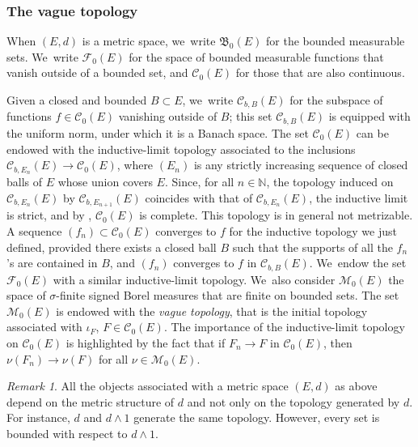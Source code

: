 \documentclass[10pt]{amsart}
\theoremstyle{definition}
\theoremstyle{remark}
\newtheorem{remark}[theorem]{Remark}
\begin{document}
\subsubsection{The vague topology}

When $(E,d)$ is a metric space, we~write $\mathfrak{B}_{0}(E)$ for the bounded measurable sets. We~write $\mathscr{F}_{0}(E)$ for the space of bounded measurable functions that vanish outside of a bounded set, and $\mathscr{C}_{0}(E)$ for those that are also continuous.

Given a closed and bounded $B \subset E$, we~write $\mathscr{C}_{b,B}(E)$ for the subspace of functions $f \in \mathscr{C}_{0}(E)$ vanishing outside of $B$; this set $\mathscr{C}_{b,B}(E)$ is equipped with the uniform norm, under which it is a Banach space.
The set $\mathscr{C}_{0}(E)$ can be endowed with the inductive-limit topology associated to the inclusions $\mathscr{C}_{b,E_{n}}(E) \to \mathscr{C}_{0}(E)$, where $(E_{n})$ is any strictly increasing sequence of closed balls of $E$ whose union covers $E$.
Since, for all $n \in \mathbb{N}$, the topology induced on $\mathscr{C}_{b,E_{n}}(E)$ by $\mathscr{C}_{b,E_{n+1}}(E)$ coincides with that of $\mathscr{C}_{b,E_{n}}(E)$, the inductive limit is strict, and by \cite[Prop.\,9(iii), p.\,II.35]{BourbakiEVT}, $\mathscr{C}_{0}(E)$ is complete.
This topology is in general not metrizable.
A sequence $(f_{n}) \subset \mathscr{C}_{0}(E)$ converges to $f$ for the inductive topology we just defined, provided there exists a closed ball $B$ such that the supports of all the $f_{n}$'s are contained in $B$, and $(f_{n})$ converges to $f$ in $\mathscr{C}_{b,B}(E)$. We~endow the set $\mathscr{F}_{0}(E)$ with a similar inductive-limit topology. We~also consider $\mathscr{M}_{0}(E)$ the space of $\sigma$-finite signed Borel measures that are finite on bounded sets.
The set $\mathscr{M}_{0}(E)$ is endowed with the \emph{vague topology}, that is the initial topology associated with $\iota_{F}$, $F \in \mathscr{C}_{0}(E)$.
The importance of the inductive-limit topology on $\mathscr{C}_{0}(E)$ is highlighted by the fact that if $F_{n} \to F$ in $\mathscr{C}_{0}(E)$, then $\nu(F_{n}) \to \nu(F)$ for all $\nu \in \mathscr{M}_{0}(E)$.
\begin{remark}
All the objects associated with a metric space $(E,d)$ as above depend on the metric structure of $d$ and not only on the topology generated by $d$.
For instance, $d$ and $d \wedge 1$ generate the same topology.
However, every set is bounded with respect to $d \wedge 1$.
\end{remark}
\end{document}
